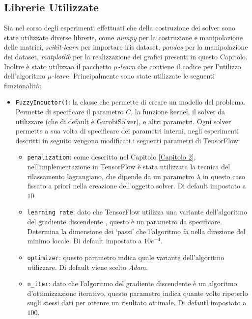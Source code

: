 \documentclass[a4paper,12pt]{report}
\begin{document}
\subsection*{Librerie Utilizzate}
Sia nel corso degli esperimenti effettuati che della costruzione dei solver sono state utilizzate diverse librerie, come \textit{numpy} \cite{NumPy} per la costruzione e manipolazione delle matrici, \textit{scikit-learn} \cite{scikit-learn} per importare iris dataset, \textit{pandas} \cite{pandas} per la manipolazione dei dataset, \textit{matplotlib} \cite{matplotlib} per la realizzazione dei grafici presenti in questo Capitolo. Inoltre è stato utilizzao il pacchetto \textit{$\mu$-learn} \cite{mulearn_documentation} che contiene il codice per l'utilizzo dell'algoritmo \textit{$\mu$-learn}. Principalmente sono state utilizzate le seguenti funzionalità:
\begin{itemize}
    \item \texttt{FuzzyInductor()}: la classe che permette di creare un modello del problema. Permette di specificare il parametro $C$, la funzione kernel, il solver da utilizzare (che di default è GurobiSolver), e altri parametri. Ogni solver permette a sua volta di specificare dei parametri interni, negli esperimenti descritti in seguito vengono modificati i seguenti parametri di TensorFlow:
    \begin{itemize}
        \item \texttt{penalization}: come descritto nel Capitolo \ref{Capitolo 2}, nell'implementazione in TensorFlow è stata utilizzata la tecnica del rilassamento lagrangiano, che dipende da un parametro $\lambda$ in questo caso fissato a priori nella creazione dell'oggetto solver. Di default impostato a $10$.
        \item \texttt{learning rate}: dato che TensorFlow utilizza una variante dell'algoritmo del gradiente discendente \cite{gradient_descent}, questo è un parametro da specificare. Determina la dimensione dei `passi' che l'algoritmo fa nella direzione del minimo locale. Di default impostato a $10e^{-4}$.
        \item \texttt{optimizer}: questo parametro indica quale variante dell'algoritmo utilizzare. Di default viene scelto \textit{Adam}.
        \item \texttt{n\_iter}: dato che l'algoritmo del gradiente discendente è un algoritmo d'ottimizzazione iterativo, questo parametro indica quante volte ripeterlo sugli stessi dati per ottenre un risultato ottimale. Di defautl impostato a $100$.
    \end{itemize}

\end{itemize}
\end{document}
